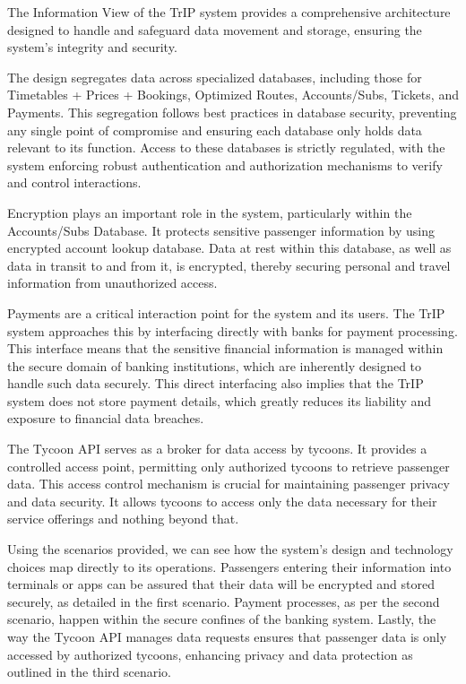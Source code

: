 The Information View of the TrIP system provides a comprehensive architecture designed to handle and safeguard data movement and storage, ensuring the system's integrity and security.

The design segregates data across specialized databases, including those for Timetables + Prices + Bookings, Optimized Routes, Accounts/Subs, Tickets, and Payments. This segregation follows best practices in database security, preventing any single point of compromise and ensuring each database only holds data relevant to its function. Access to these databases is strictly regulated, with the system enforcing robust authentication and authorization mechanisms to verify and control interactions.

Encryption plays an important role in the system, particularly within the Accounts/Subs Database. It protects sensitive passenger information by using encrypted account lookup database. Data at rest within this database, as well as data in transit to and from it, is encrypted, thereby securing personal and travel information from unauthorized access.

Payments are a critical interaction point for the system and its users. The TrIP system approaches this by interfacing directly with banks for payment processing. This interface means that the sensitive financial information is managed within the secure domain of banking institutions, which are inherently designed to handle such data securely. This direct interfacing also implies that the TrIP system does not store payment details, which greatly reduces its liability and exposure to financial data breaches.

The Tycoon API serves as a broker for data access by tycoons. It provides a controlled access point, permitting only authorized tycoons to retrieve passenger data. This access control mechanism is crucial for maintaining passenger privacy and data security. It allows tycoons to access only the data necessary for their service offerings and nothing beyond that.

Using the scenarios provided, we can see how the system's design and technology choices map directly to its operations. Passengers entering their information into terminals or apps can be assured that their data will be encrypted and stored securely, as detailed in the first scenario. Payment processes, as per the second scenario, happen within the secure confines of the banking system. Lastly, the way the Tycoon API manages data requests ensures that passenger data is only accessed by authorized tycoons, enhancing privacy and data protection as outlined in the third scenario.

